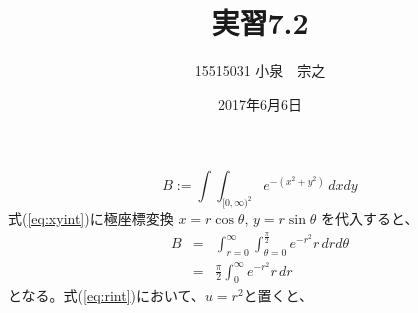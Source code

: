 \documentclass[12pt,a4j]{jarticle}
\title{実習7.2}
\author{15515031 小泉　宗之}
\date{2017年6月6日}
\begin{document}
\maketitle
\begin{equation}
B:=\int\int_{[0,\infty)^2}
e^{-(x^2+y^2)}\,dxdy\label{eq:xyint}
\end{equation}
式(\ref{eq:xyint})に極座標変換
$x=r\cos\theta$, $y=r\sin\theta$
を代入すると、
\begin{eqnarray}
B & = & \int_{r=0}^{\infty}
\int_{\theta=0}^{\frac{\pi}{2}}
e^{-r^2}r\,drd\theta \nonumber \\
& = & \frac{\pi}{2}\int_{0}^\infty
e^{-r^2}r\,dr\label{eq:rint}
\end{eqnarray}
となる。式(\ref{eq:rint})において、$u=r^2$と置くと、
\begin{eqnarray}

\end{eqnarray}
\end{document}
